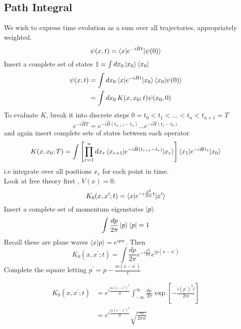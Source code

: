 \documentclass{article}
\begin{document}
\subsection{Path Integral}
We wish to express time evolution as a sum over all  trajectories, appropriately weighted. 
\[
\psi(x,t) = \braket{x | e^{-i\hat{H}t} | \psi(0)}
\]
Insert a complete set of states $1 = \int dx_0 \ket{x_0} \bra{x_0}$ 
\begin{align*}
    \psi(x,t) &= \int dx_0 \braket{x| e^{-i\hat{H}t} | x_0} \braket{x_0 | \psi(0)} \\ 
    &= \int dx_0 \, K(x,x_0 ; t) \psi(x_0,0)
\end{align*}
To evaluate $K$, break it into discrete steps $0=t_0 < t_1 < \dots < t_n < t_{n+1}=T$
\[
e^{-i\hat{H}T} = e^{-i\hat{H}(t_{n+1}-t_n)} \dots e^{-i\hat{H}(t_1-t_0)}
\]
and again insert complete sets of states between each operator 
\[
K(x,x_0 ; T) = \int \left[ \prod_{r=1}^n dx_r \braket{x_{r+1}|e^{-i\hat{H}(t_{r+1}-t_r)}|x_r}      \right] \braket{x_1 | e^{-i\hat{H} t_1} | x_0}
\]
i.e integrate over all positions $x_r$ for each point in time. \\
Look at free theory first , $V(x)=0$. 
\[
K_0(x,x^\prime;t) = \braket{x | e^{-i\frac{\hat{p}^2}{2m}t} | x^\prime }
\]
Insert a complete set of momentum eigenstates $\ket{p}$ 
\[
\int \frac{dp}{2\pi} \ket{p}\bra{p} = 1
\]
Recall these are plane waves $\braket{x|p} = e^{ipx}$. Then 
\[
K_0(x,x^\prime;t) = \int \frac{dp}{2\pi} e^{-i \frac{p^2 t}{2m}} e^{ip(x-x^\prime)}
\]
Complete the square letting $p^\prime = p-\frac{m(x-x^\prime)}{t}$

\begin{align*}
K_0(x,x^\prime;t) &= e^{i\frac{m(x-x^\prime)^2}{2t}} \int_{-\infty}^\infty \frac{dp^\prime}{2\pi} \exp \left[ - \frac{i(p^\prime)^2 t}{2m} \right] \\ 
&= e^{i\frac{m(x-x^\prime)^2}{2t}} \sqrt{\frac{m}{2\pi i t}} 
\end{align*}
\end{document}
